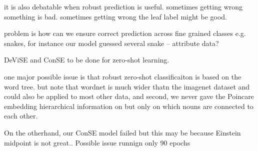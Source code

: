 \documentclass[12pt]{report}
\begin{document}
it is also debatable when robust prediction is useful. sometimes getting wrong something is bad. sometimes getting wrong the leaf label might be good.

problem is how can we ensure correct prediction across fine grained classes e.g. snakes, for instance our model guessed several snake -- attribute data? 

DeViSE and ConSE to be done for zero-shot learning.

one major possible issue is that robust zero-shot classificaiton is based on the word tree. but note that wordnet is much wider thatn the imagenet dataset and could also be applied to most other data, and second, we never gave the Poincare embedding hierarchical information on but only on which nouns are connected to each other.

On the otherhand, our ConSE model failed but this may be because Einstein midpoint is not great..  
Possible issue runnign only 90 epochs



\end{document}
